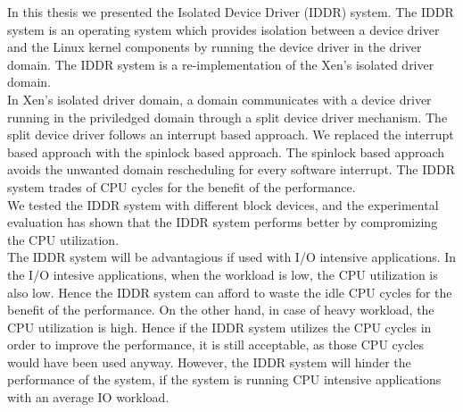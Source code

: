 In this thesis we presented the Isolated Device Driver (IDDR) system. The IDDR system is an operating system which provides isolation between a device driver and the Linux kernel components by running the device driver in the driver domain. The IDDR system is a re-implementation of the Xen's isolated driver domain.
\\[3mm]
In Xen's isolated driver domain, a domain communicates with a device driver running in the priviledged domain through a split device driver mechanism. The split device driver follows an interrupt based approach. We replaced the interrupt based approach with the spinlock based approach. The spinlock based approach avoids the unwanted domain rescheduling for every software interrupt. The IDDR system trades of CPU cycles for the benefit of the performance.
\\[3mm]
We tested the IDDR system with different block devices, and the experimental evaluation has shown that the IDDR system performs better by compromizing the CPU utilization. 
\\[3mm]
The IDDR system will be advantagious if used with I/O intensive applications. In the I/O intesive applications, when the workload is low, the CPU utilization is also low. Hence the IDDR system can afford to waste the idle CPU cycles for the benefit of the performance. On the other hand, in case of heavy workload, the CPU utilization is high. Hence if the IDDR system utilizes the CPU cycles in order to improve the performance, it is still acceptable, as those CPU cycles would have been used anyway. However, the IDDR system will hinder the performance of the system, if the system is running CPU intensive applications with an average IO workload.